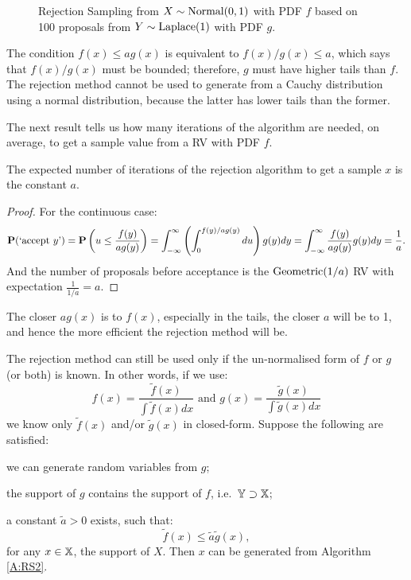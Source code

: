 \begin{figure}[htpb]
\caption{Rejection Sampling from $X \sim \mbox{{\rm Normal}}(0,1)$ with PDF $f$ based on  100 proposals from $Y \sim \mbox{{\rm Laplace}}(1)$ with PDF $g$.\label{F:RSNormalLaplace}}
\centering   {}
\end{figure}

\begin{classwork}
The condition $f(x)\leq ag(x)$ is equivalent to $f(x)/g(x)\leq a$, which says that $f(x)/g(x)$ must be bounded; therefore, $g$ must have higher tails than $f$.
The rejection method cannot be used to generate from a Cauchy distribution using a normal distribution, because the latter has lower tails than the former.
\end{classwork}


The next result tells us how many iterations of the algorithm are needed, on average, to get a sample value from a RV with PDF $f$.

\begin{prop} The expected number of iterations of the rejection algorithm to get a sample $x$ is the constant $a$.

\begin{proof}
For the continuous case:
\begin{displaymath}
\mathbf{P}(\textrm{`accept }y\textrm{'})=\mathbf{P}\left( u\leq \frac{f(y)}{ag(y)}\right)=\int^{\infty}_{-\infty}\left(\int^{f(y)/ag(y)}_0du\right)g(y)dy=\int^{\infty}_{-\infty}\frac{f(y)}{ag(y)}g(y)dy=\frac{1}{a}.
\end{displaymath}
And the number of proposals before acceptance is the $\mbox{{\rm Geometric}}(1/a)$ RV with expectation $\frac{1}{1/a}=a$.
\end{proof}
\end{prop}

The closer $ag(x)$ is to $f(x)$, especially in the tails, the closer $a$ will be to 1, and hence the more efficient the rejection method will be.

The rejection method can still be used only if the un-normalised form of $f$ or $g$ (or both) is known. In other words, if we use:
$$f(x)=\frac{\tilde{f}(x)}{\int \tilde{f}(x)dx} \textrm{ and } g(x)=\frac{\tilde{g}(x)}{\int \tilde{g}(x)dx} $$
we know only $\tilde{f} (x)$ and/or $\tilde{g}(x)$ in closed-form.  Suppose the following are satisfied:
\begin{asparaenum}[(a)]
\item	we can generate random variables from $g$;
\item	the support of $g$ contains the support of $f$, i.e.~$\mathbb{Y} \supset \mathbb{X}$;
\item	a constant $\tilde{a} > 0$ exists, such that:
\begin{equation}
\tilde{f}(x)\leq\tilde{a}\tilde{g}(x),
\end{equation}
for any $x\in \mathbb{X}$, the support of $X$.  Then $x$ can be generated from Algorithm \ref*{A:RS2}.
\end{asparaenum}


